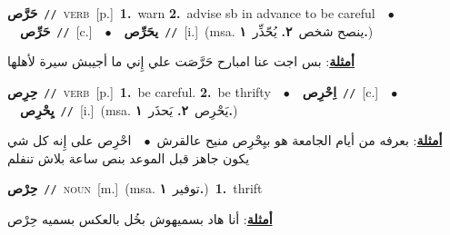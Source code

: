\documentclass[10pt,a4paper,twoside]{article} %
\begin{document}
\begin{multicols}{2}
{\setlength\topsep{0pt}\textbf{\foreignlanguage{arabic}{حَرَّص}}\ {\color{gray}\texttt{//}\color{black}}\ \textsc{verb}\ [p.]\ \textbf{1.}~warn  \textbf{2.}~advise sb in advance to be careful\ \ $\bullet$\ \ \setlength\topsep{0pt}\textbf{\foreignlanguage{arabic}{حَرِّص}}\ {\color{gray}\texttt{//}\color{black}}\ [c.]\ \ $\bullet$\ \ \setlength\topsep{0pt}\textbf{\foreignlanguage{arabic}{يحَرِّص}}\ {\color{gray}\texttt{//}\color{black}}\ [i.]\ \color{gray}(msa. \foreignlanguage{arabic}{ينصح شخص}~\foreignlanguage{arabic}{\textbf{٢.}}  \foreignlanguage{arabic}{يُحّذِّر}~\foreignlanguage{arabic}{\textbf{١.}})\color{black}\  \begin{flushright}\color{gray}\foreignlanguage{arabic}{\textbf{\underline{\foreignlanguage{arabic}{أمثلة}}}: بس اجت عنا امبارح حَرَّصَت علي إِني ما أجيبش سيرة لأهلها}\end{flushright}\color{black}} \vspace{2mm}

{\setlength\topsep{0pt}\textbf{\foreignlanguage{arabic}{حِرِص}}\ {\color{gray}\texttt{//}\color{black}}\ \textsc{verb}\ [p.]\ \textbf{1.}~be careful.  \textbf{2.}~be thrifty\ \ $\bullet$\ \ \setlength\topsep{0pt}\textbf{\foreignlanguage{arabic}{اِحْرِص}}\ {\color{gray}\texttt{//}\color{black}}\ [c.]\ \ $\bullet$\ \ \setlength\topsep{0pt}\textbf{\foreignlanguage{arabic}{يِحْرِص}}\ {\color{gray}\texttt{//}\color{black}}\ [i.]\ \color{gray}(msa. \foreignlanguage{arabic}{يَحْرِص}~\foreignlanguage{arabic}{\textbf{٢.}}  \foreignlanguage{arabic}{يَحذَر}~\foreignlanguage{arabic}{\textbf{١.}})\color{black}\  \begin{flushright}\color{gray}\foreignlanguage{arabic}{\textbf{\underline{\foreignlanguage{arabic}{أمثلة}}}: بعرفه من أيام الجامعة هو بيِحْرِص منيح عالقرش\ $\bullet$\ \  احْرِص على إِنه كل شي يكون جاهز قبل الموعد بنص ساعة بلاش تنفلم}\end{flushright}\color{black}} \vspace{2mm}

{\setlength\topsep{0pt}\textbf{\foreignlanguage{arabic}{حِرْص}}\ {\color{gray}\texttt{//}\color{black}}\ \textsc{noun}\ [m.]\ \color{gray}(msa. \foreignlanguage{arabic}{توفير}~\foreignlanguage{arabic}{\textbf{١.}})\color{black}\ \textbf{1.}~thrift\  \begin{flushright}\color{gray}\foreignlanguage{arabic}{\textbf{\underline{\foreignlanguage{arabic}{أمثلة}}}: أنا هاد بسميهوش بخُل بالعكس بسميه حِرْص}\end{flushright}\color{black}} \vspace{2mm}


\end{multicols}
\end{document}
